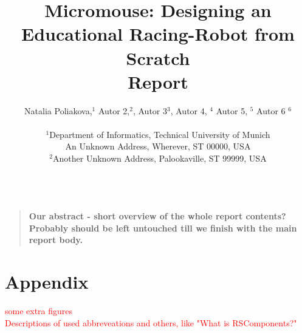 \documentclass[12pt]{article}
\title{Micromouse: Designing an Educational Racing-Robot from Scratch \\Report}
\author
{Natalia Poliakova,$^{1}$ Autor 2,$^{2}$, Autor 3$^{3}$, Autor 4, $^{4}$ Autor 5, $^{5}$ Autor 6 $^{6}$\\
\\
\normalsize{$^{1}$Department of Informatics, Technical University of Munich}\\
\normalsize{An Unknown Address, Wherever, ST 00000, USA}\\
\normalsize{$^{2}$Another Unknown Address, Palookaville, ST 99999, USA}\\
\\
}
\date{}
\newenvironment{sciabstract}{%
\begin{quote} \bf}
{\end{quote}}
\begin{document}

\baselineskip24pt


\maketitle


\begin{sciabstract}
    Our abstract - short overview of the whole report contents? Probably should be left untouched till we finish with the main report body.
\end{sciabstract}

\newpage

\tableofcontents




\newpage










\newpage
\section*{Appendix}
\textcolor{red}{
some extra figures\\
Descriptions of used abbreveations and others, like "What is RSComponents?"
}
\vspace{3cm}
\end{document}

